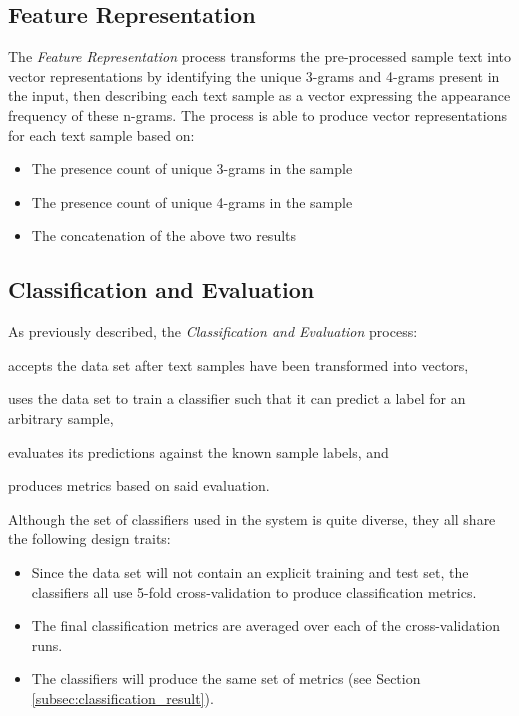 \documentclass[conference]{sig-alternate-05-2015}
\begin{document}
\subsection{Feature Representation}\label{subsec:feature_rep}
The \textit{Feature Representation} process transforms the pre-processed sample
text into vector representations by identifying the unique 3-grams and 4-grams
present in the input, then describing each text sample as a vector expressing
the appearance frequency of these n-grams. The process is able to produce
vector representations for each text sample based on:
\begin{itemize}
  \item The presence count of unique 3-grams in the sample
  \item The presence count of unique 4-grams in the sample
  \item The concatenation of the above two results
\end{itemize}

\subsection{Classification and Evaluation}\label{subsec:classification}
As previously described, the \textit{Classification and Evaluation} process:
\begin{enumerate*}[(1)]
  \item accepts the data set after text samples have been transformed into
  vectors,
  \item uses the data set to train a classifier such that it can predict a label
  for an arbitrary sample,
  \item evaluates its predictions against the known sample labels, and
  \item produces metrics based on said evaluation.
\end{enumerate*}\par

Although the set of classifiers used in the system is quite diverse, they all
share the following design traits:
\begin{itemize}
  \item Since the data set will not contain an explicit training and test set,
  the classifiers all use 5-fold cross-validation to produce classification
  metrics.
  \item The final classification metrics are averaged over each of the
  cross-validation runs.
  \item The classifiers will produce the same set of metrics (see Section
  \ref{subsec:classification_result}).
\end{itemize}
\end{document}
